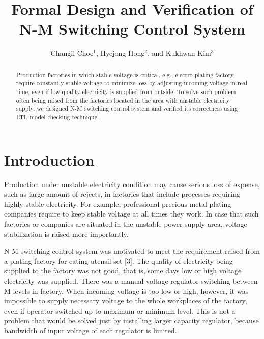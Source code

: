 \documentclass[runningheads,a4paper]{llncs}
\begin{document}
\mainmatter  

\title{Formal Design and Verification of N-M Switching Control System}



\author{Changil Choe$^1$, Hyejong Hong$^2$, and Kukhwan Kim$^3$}






\maketitle


\begin{abstract}
Production factories in which stable voltage is critical, e.g., electro-plating factory, require constantly stable voltage to minimize loss by adjusting incoming voltage in real time, even if low-quality electricity is supplied from outside. To solve such problem often being raised from the factories located in the area with unstable electricity supply, we designed N-M switching control system and verified its correctness using LTL model checking technique.
\end{abstract}


\section{Introduction}
Production under unstable electricity condition may cause serious loss of expense, such as large amount of rejects, in factories that include processes requiring highly stable electricity. For example, professional precious metal plating companies require to keep stable voltage at all times they work. In case that such factories or companies are situated in the unstable power supply area, voltage stabilization is raised more importantly. 

N-M switching control system was motivated to meet the requirement raised from a plating factory for eating utensil set [3]. The quality of electricity being supplied to the factory was not good, that is, some days low or high voltage electricity was supplied. There was a manual voltage regulator switching between M levels in factory. When incoming voltage is too low or high, however, it was impossible to supply necessary voltage to the whole workplaces of the factory, even if operator switched up to maximum or minimum level. This is not a problem that would be solved just by installing larger capacity regulator, because bandwidth of input voltage of each regulator is limited.
\end{document}
